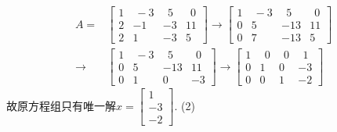 \documentclass[a4paper]{book}
\begin{document}
\begin{displaymath}
\begin{aligned}
A=&\begin{bmatrix} 1&\ -3&\ \ 5&\ \ 0\\2&-1&-3&11\\2&1&-3&5 \end{bmatrix}\rightarrow
\begin{bmatrix}1&\ -3&\ \ 5&\ \ 0\\0&5&-13&11\\0&7&-13&5  \end{bmatrix}\\ \rightarrow&
\begin{bmatrix}1&\ -3&\ \ 5&\ \ 0\\0&5&-13&11\\0&1&0&-3  \end{bmatrix} \rightarrow
\begin{bmatrix} 1&\ \ 0&\ \ 0&\ \ 1\\0&1&0&-3\\0&0&1&-2 \end{bmatrix}
\end{aligned} \end{displaymath}
故原方程组只有唯一解$x=\begin{bmatrix}1\\-3\\-2\end{bmatrix}$.
(2)
\end{document}
